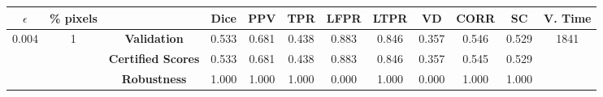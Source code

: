 \begin{longtable}{ c  c | c | c  c  c  c  c  c  c c c}
\toprule \textbf{$\epsilon$} & \textbf{\% pixels} & & \textbf{Dice} & \textbf{PPV} & \textbf{TPR} & \textbf{LFPR} & \textbf{LTPR} & \textbf{VD} & \textbf{CORR} & \textbf{SC} & \textbf{V. Time} \\
\midrule 
\multirow{3}{*}{0.004}  & \multirow{3}{*}{1} &\textbf{Validation} & 0.533 & 0.681 & 0.438 & 0.883 & 0.846 & 0.357 & 0.546 & 0.529 & \multirow{3}{*}{1841} \\
 & & \textbf{Certified Scores} & 0.533 & 0.681 & 0.438 & 0.883 & 0.846 & 0.357 & 0.545 & 0.529 & \\
& & \textbf{Robustness} & 1.000 & 1.000 & 1.000 & 0.000 & 1.000 & 0.000 & 1.000 & 1.000 & \\
\end{longtable}